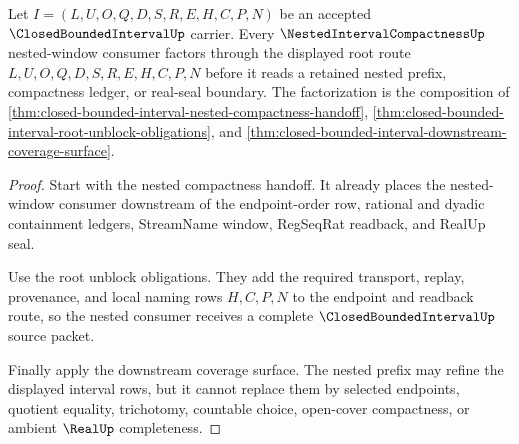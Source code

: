 \begin{theorem}
\label{thm:closed-bounded-interval-nested-window-factorization}
Let $I=(L,U,O,Q,D,S,R,E,H,C,P,N)$ be an accepted $\ClosedBoundedIntervalUp$ carrier. Every $\NestedIntervalCompactnessUp$ nested-window consumer factors through the displayed root route $L,U,O,Q,D,S,R,E,H,C,P,N$ before it reads a retained nested prefix, compactness ledger, or real-seal boundary. The factorization is the composition of \autoref{thm:closed-bounded-interval-nested-compactness-handoff}, \autoref{thm:closed-bounded-interval-root-unblock-obligations}, and \autoref{thm:closed-bounded-interval-downstream-coverage-surface}.
\end{theorem}
\begin{proof}
Start with the nested compactness handoff. It already places the nested-window consumer downstream of the endpoint-order row, rational and dyadic containment ledgers, StreamName window, RegSeqRat readback, and RealUp seal.

Use the root unblock obligations. They add the required transport, replay, provenance, and local naming rows $H,C,P,N$ to the endpoint and readback route, so the nested consumer receives a complete $\ClosedBoundedIntervalUp$ source packet.

Finally apply the downstream coverage surface. The nested prefix may refine the displayed interval rows, but it cannot replace them by selected endpoints, quotient equality, trichotomy, countable choice, open-cover compactness, or ambient $\RealUp$ completeness.
\end{proof}

